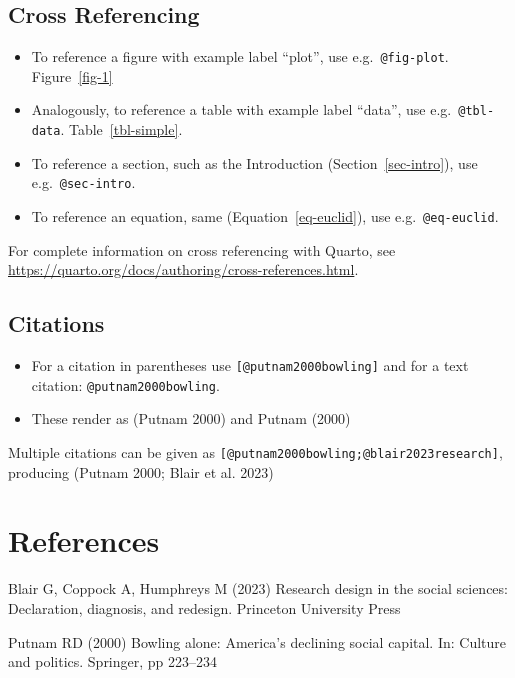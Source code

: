 \documentclass[
  sn-nature,
]{sn-jnl}
\providecommand{\tightlist}{%
  \setlength{\itemsep}{0pt}\setlength{\parskip}{0pt}}\usepackage{longtable,booktabs,array}
\newlength{\cslhangindent}
\newenvironment{CSLReferences}[2] %
 {\begin{list}{}{%
  \setlength{\itemindent}{0pt}
  \setlength{\leftmargin}{0pt}
  \setlength{\parsep}{0pt}
  \ifodd #1
   \setlength{\leftmargin}{\cslhangindent}
   \setlength{\itemindent}{-1\cslhangindent}
  \fi
  \setlength{\itemsep}{#2\baselineskip}}}
 {\end{list}}
\begin{document}
\subsection{Cross Referencing}\label{cross-referencing}

\begin{itemize}
\tightlist
\item
  To reference a figure with example label ``plot'', use
  e.g.~\texttt{@fig-plot}. Figure~\ref{fig-1}
\item
  Analogously, to reference a table with example label ``data'', use
  e.g.~\texttt{@tbl-data}. Table~\ref{tbl-simple}.
\item
  To reference a section, such as the Introduction
  (Section~\ref{sec-intro}), use e.g.~\texttt{@sec-intro}.
\item
  To reference an equation, same (Equation~\ref{eq-euclid}), use
  e.g.~\texttt{@eq-euclid}.
\end{itemize}

For complete information on cross referencing with Quarto, see
\url{https://quarto.org/docs/authoring/cross-references.html}.

\subsection{Citations}\label{citations}

\begin{itemize}
\tightlist
\item
  For a citation in parentheses use \texttt{{[}@putnam2000bowling{]}}
  and for a text citation: \texttt{@putnam2000bowling}.
\item
  These render as (Putnam 2000) and Putnam (2000)
\end{itemize}

Multiple citations can be given as
\texttt{{[}@putnam2000bowling;@blair2023research{]}}, producing (Putnam
2000; Blair et al. 2023)

\newpage

\section{References}\label{references}

\label{refs}
\begin{CSLReferences}{1}{1}
Blair G, Coppock A, Humphreys M (2023) Research design in the social
sciences: Declaration, diagnosis, and redesign. Princeton University
Press

Putnam RD (2000) Bowling alone: America's declining social capital. In:
Culture and politics. Springer, pp 223--234

\end{CSLReferences}
\end{document}
